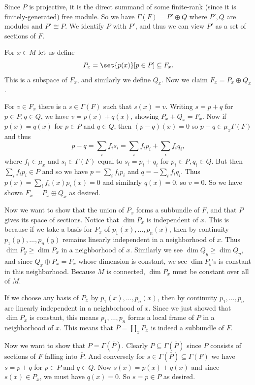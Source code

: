 \ethrm

\bproof

    Since $P$ is projective, it is the direct summand of some finite-rank (since it is finitely-generated) free module.
    So we have $\Gamma(F)=P'\oplus Q$ where $P',Q$ are modules and $P'\cong P$.
    We identify $P$ with $P'$, and thus we can view $P'$ as a set of sections of $F$.

    For $x\in M$ let us define
    $$ P_x = \set{p(x)}[p\in P] \subseteq F_x . $$
    This is a subspace of $F_x$, and similarly we define $Q_x$.
    Now we claim $F_x=P_x\oplus Q_x$.

    For $v\in F_x$ there is a $s\in\Gamma(F)$ such that $s(x)=v$.
    Writing $s=p+q$ for $p\in P,q\in Q$, we have $v=p(x)+q(x)$, showing $P_x+Q_x=F_x$.
    Now if $p(x)=q(x)$ for $p\in P$ and $q\in Q$, then $(p-q)(x)=0$ so $p-q\in\mu_x\Gamma(F)$ and thus
    $$ p-q = \sum_if_is_i = \sum_if_ip_i + \sum_if_iq_i, $$
    where $f_i\in\mu_x$ and $s_i\in\Gamma(F)$ equal to $s_i=p_i+q_i$ for $p_i\in P,q_i\in Q$.
    But then $\sum_if_ip_i\in P$ and so we have $p=\sum_if_ip_i$ and $q=-\sum_if_iq_i$.
    Thus $p(x)=\sum_if_i(x)p_i(x)=0$ and similarly $q(x)=0$, so $v=0$.
    So we have shown $F_x=P_x\oplus Q_x$ as desired.

    Now we want to show that the union of $P_x$ forms a subbundle of $F$, and that $P$ gives its space of sections.
    Notice that $\dim P_x$ is independent of $x$.
    This is because if we take a basis for $P_x$ of $p_1(x),\dots,p_n(x)$, then by continuity $p_1(y),\dots,p_n(y)$ remains linearly independent
    in a neighborhood of $x$.
    Thus $\dim P_y\geq\dim P_x$ in a neighborhood of $x$.
    Similarly we see $\dim Q_y\geq\dim Q_y$, and since $Q_x\oplus P_x=F_x$ whose dimension is constant, we see $\dim P_y$'s is constant in this neighborhood.
    Because $M$ is connected, $\dim P_x$ must be constant over all of $M$.

    If we choose any basis of $P_x$ by $p_1(x),\dots,p_n(x)$, then by continuity $p_1,\dots,p_n$ are linearly independent in a neighborhood of $x$.
    Since we just showed that $\dim P_x$ is constant, this means $p_1,\dots,p_n$ forms a local frame of $P$ in a neighborhood of $x$.
    This means that $\bar P=\coprod_xP_x$ is indeed a subbundle of $F$.

    Now we want to show that $P=\Gamma(\bar P)$.
    Clearly $P\subseteq\Gamma(\bar P)$ since $P$ consists of sections of $F$ falling into $\bar P$.
    And conversely for $s\in\Gamma(\bar P)\subseteq\Gamma(F)$ we have $s=p+q$ for $p\in P$ and $q\in Q$.
    Now $s(x)=p(x)+q(x)$ and since $s(x)\in P_x$, we must have $q(x)=0$.
    So $s=p\in P$ as desired.

